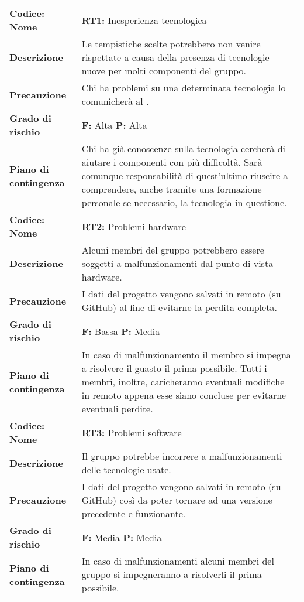 \setcounter{table}{-1}
{


\centering
\renewcommand{\arraystretch}{1.5}
\begin{longtable}{C{3.5cm} | C{11cm}}
\textbf{Codice: Nome} & \textbf{RT1: }{Inesperienza tecnologica}\\
\textbf{Descrizione} & Le tempistiche scelte potrebbero non venire rispettate a causa della presenza di tecnologie nuove per molti componenti del gruppo.\\ 
\textbf{Precauzione} & Chi ha problemi su una determinata tecnologia lo comunicherà al \respProg{}.\\
\textbf{Grado di rischio} & \textbf{F: }  Alta \textbf{P: } Alta\\   
\textbf{Piano di contingenza} & Chi ha già conoscenze sulla tecnologia cercherà di aiutare i componenti con più difficoltà. Sarà comunque responsabilità di quest'ultimo riuscire a comprendere, anche tramite una formazione personale se necessario, la tecnologia in questione.\\
\hline

\textbf{Codice: Nome} & \textbf{RT2: }{Problemi hardware}\\
\textbf{Descrizione} & Alcuni membri del gruppo potrebbero essere soggetti a malfunzionamenti dal punto di vista hardware.\\ 
\textbf{Precauzione} & I dati del progetto vengono salvati in remoto (su GitHub) al fine di evitarne la perdita completa.\\
\textbf{Grado di rischio} & \textbf{F: }Bassa \textbf{P: }Media\\ 
\textbf{Piano di contingenza} & In caso di malfunzionamento il membro si impegna a risolvere il guasto il prima possibile. Tutti i membri, inoltre, caricheranno eventuali modifiche in remoto appena esse siano concluse per evitarne eventuali perdite.\\
\hline

\textbf{Codice: Nome} & \textbf{RT3: }{Problemi software}\\
\textbf{Descrizione} & Il gruppo potrebbe incorrere a malfunzionamenti delle tecnologie usate.\\ 
\textbf{Precauzione} & I dati del progetto vengono salvati in remoto (su GitHub) così da poter tornare ad una versione precedente e funzionante.\\
\textbf{Grado di rischio} & \textbf{F: }Media \textbf{P: }Media\\ 
\textbf{Piano di contingenza} & In caso di malfunzionamenti alcuni membri del gruppo si impegneranno a risolverli il prima possibile.\\
\hline


\end{longtable}}
